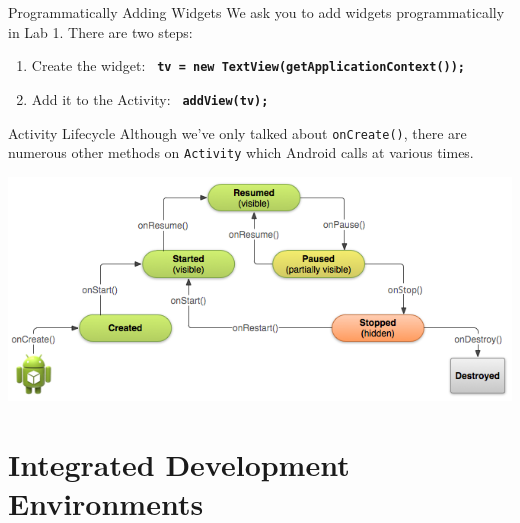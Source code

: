 \documentclass[aspectratio=169]{beamer}
\begin{document}
\begin{frame}{Programmatically Adding Widgets}
We ask you to
add widgets programmatically in Lab 1. There are two steps:
\begin{enumerate}
\item Create the widget: 
\texttt{\textbf{~tv = new TextView(getApplicationContext());}} 
\item Add it to the Activity:
\texttt{\textbf{~addView(tv);}}
\end{enumerate}
\end{frame}



\begin{frame}{Activity Lifecycle}
Although we've only talked about {\tt onCreate()}, there are numerous
other methods on {\tt Activity} which Android calls at various times.

\begin{center}
\includegraphics[width=.9\textwidth]{img/basic-lifecycle.png}
\end{center}
\end{frame}



\section*{Integrated Development Environments}
\end{document}
